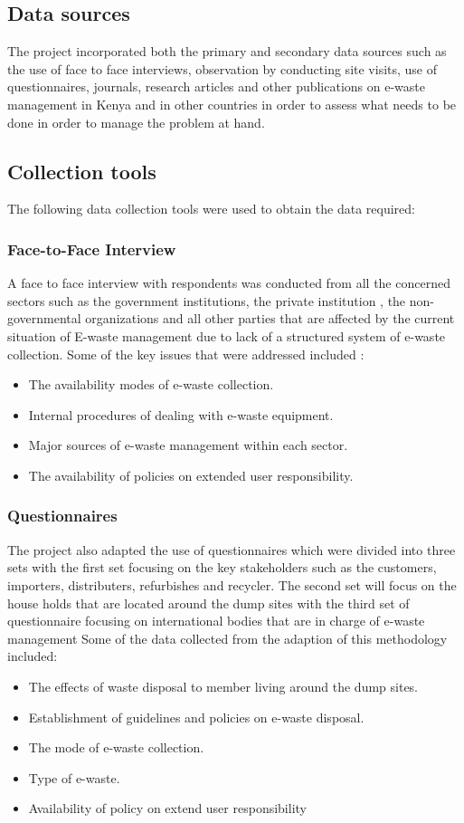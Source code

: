 \documentclass{article}
\begin{document}
\subsection{Data sources}
The project  incorporated both the primary and secondary data sources such as the use of face to face interviews, observation by conducting site visits, use of questionnaires, journals, research articles and other publications on e-waste management in Kenya and in other countries in order to assess what needs to be done in order to manage the problem at hand.
\subsection{Collection tools}
The following data collection tools were used to obtain the data required:
\subsubsection{Face-to-Face Interview}
A face to face interview with respondents was conducted from all the concerned sectors such as the government institutions, the private institution , the non-governmental organizations  and all other parties that are affected by the current situation of E-waste management due to lack of a structured system of e-waste collection. Some of the key issues that were addressed included :
\begin{itemize}
\item The availability modes of e-waste collection.
\item Internal procedures of dealing with e-waste equipment.
\item Major sources of e-waste management within each sector.
\item The availability of policies on extended user responsibility.
\end{itemize}
\subsubsection{Questionnaires}
The project  also adapted the use of questionnaires which were divided into three sets with the first set focusing on the key stakeholders such as the customers, importers, distributers, refurbishes  and recycler. The second set will focus on the house holds that are located around the dump sites with the third set of questionnaire focusing on international bodies that are in charge of e-waste management
Some of the data collected from the adaption of this methodology included:
\begin{itemize}
\item The effects of waste disposal to member living around the dump sites.
\item Establishment of guidelines and policies on e-waste disposal.
\item The mode of e-waste collection.
\item Type of e-waste.
\item Availability of policy on extend user responsibility
\end{itemize}
\end{document}
